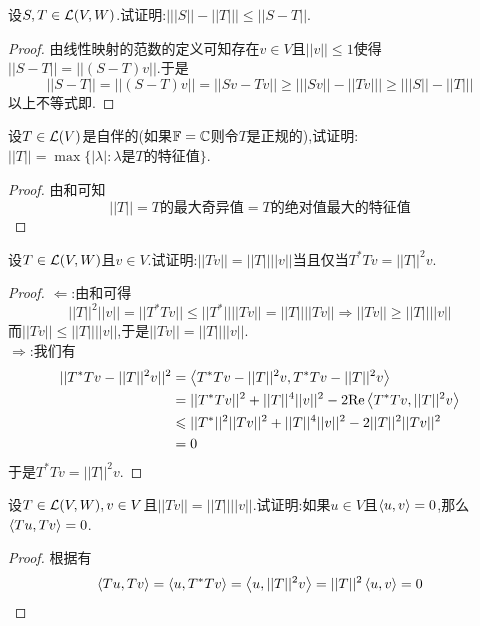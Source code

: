 \documentclass{ctexart}
\begin{document}
\pagestyle{empty}
\begin{center}
    \large{}
\end{center}
\begin{problem}[1.]
    设$S,T\in\mathcal{L}(V,W)$.试证明:$\left|||S||-||T||\right|\leqslant||S-T||$.
\end{problem}
\begin{proof}
    由线性映射的范数的定义可知存在$v\in V$且$||v||\leqslant1$使得$||S-T||=||(S-T)v||$.于是
    \[||S-T||=||(S-T)v||=||Sv-Tv||\geqslant\left|||Sv||-||Tv||\right|\geqslant\left|||S||-||T||\right|\]
    以上不等式即.
\end{proof}
\begin{problem}[2.]
    设$T\in\mathcal{L}(V)$是自伴的(如果$\mathbb{F}=\mathbb{C}$则令$T$是正规的),试证明:$||T||=\max\{|\lambda|:\lambda\text{是}T\text{的特征值}\}$.
\end{problem}
\begin{proof}
    由和可知
    \[||T||=T\text{的最大奇异值}=T\text{的绝对值最大的特征值}\]
\end{proof}
\begin{problem}[3.]
    设$T\in\mathcal{L}(V,W)$且$v\in V$.试证明:$||Tv||=||T||||v||$当且仅当$T^*Tv=||T||^2v$.
\end{problem}
\begin{proof}
    $\Leftarrow$:由和可得
    \[||T||^2||v||=||T^*Tv||\leqslant||T^*||||Tv||=||T||||Tv||\Rightarrow||Tv||\geqslant||T||||v||\]
    而$||Tv||\leqslant||T||||v||$,于是$||Tv||=||T||||v||$.\\
    $\Rightarrow$:我们有
    \[\begin{aligned}
        ||T^*Tv-||T||^2v||^2
        &= \left\langle{T^*Tv-||T||^2v},{T^*Tv-||T||^2v}\right\rangle \\
        &= ||T^*Tv||^2+||T||^4||v||^2-2\text{Re}\left\langle{T^*Tv},{||T||^2v}\right\rangle \\
        &\leqslant ||T^*||^2||Tv||^2+||T||^4||v||^2-2||T||^2||Tv||^2 \\
        &= 0
    \end{aligned}\]
    于是$T^*Tv=||T||^2v$.
\end{proof}
\begin{problem}[4.]
    设$T\in\mathcal{L}(V,W),v\in V$且$||Tv||=||T||||v||$.试证明:如果$u\in V$且$\left\langle{u},{v}\right\rangle=0$,那么$\left\langle{Tu},{Tv}\right\rangle=0$.
\end{problem}
\begin{proof}
    根据有
    \[\left\langle{Tu},{Tv}\right\rangle=\left\langle{u},{T^*Tv}\right\rangle=\left\langle{u},{||T||^2v}\right\rangle=||T||^2\left\langle{u},{v}\right\rangle=0\]
\end{proof}
\end{document}
